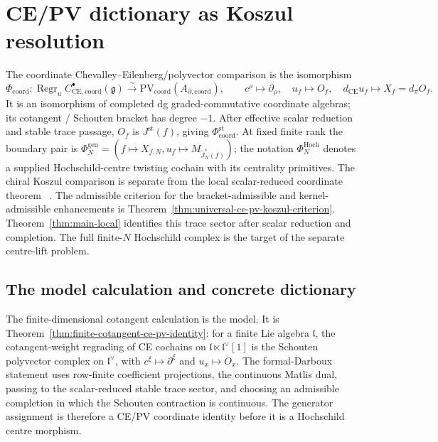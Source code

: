 \documentclass[11pt]{memoir}
\begin{document}
\section{CE/PV dictionary as Koszul resolution}\label{sec:ce-pv-koszul}

The coordinate Chevalley--Eilenberg/polyvector comparison is the
isomorphism
\[
  \Phi_{\mathrm{coord}}\colon
  \operatorname{Regr}_u
  C^\bullet_{\mathrm{CE},\mathrm{coord}}(\mathfrak g)
  \xrightarrow{\sim}
  \mathrm{PV}_{\mathrm{coord}}(A_{\partial,\mathrm{coord}}),
  \qquad
  c^\rho\mapsto\partial_\rho,\quad
  u_f\mapsto O_f,\quad
  d_{\mathrm{CE}}u_f\mapsto X_f=d_\pi O_f .
\]
It is an isomorphism of completed dg graded-commutative coordinate
algebras; its cotangent / Schouten bracket has degree \(-1\).  After
effective scalar reduction and stable trace passage, \(O_f\) is
\(J^{\mathrm{st}}(f)\), giving
\(\Phi_{\mathrm{coord}}^{\mathrm{st}}\).  At fixed finite rank the
boundary pair is
\(\Phi_N^{\mathrm{gen}}=(f\mapsto X_{f,N},
u_f\mapsto M_{\widetilde J_N^s(f)})\); the notation
\(\Phi_N^{\mathrm{Hoch}}\) denotes a supplied Hochschild-centre
twisting cochain with its centrality primitives.  The chiral Koszul
comparison is separate from the local scalar-reduced coordinate theorem
~\cite{francis-gaitsgory-chiral-koszul}.  The admissible criterion for
the bracket-admissible and kernel-admissible enhancements is
Theorem~\ref{thm:universal-ce-pv-koszul-criterion}.  Theorem~\ref{thm:main-local}
identifies this trace sector after scalar reduction and completion.  The
full finite-\(N\) Hochschild complex is the target of the separate
centre-lift problem.

\subsection{The model calculation and concrete dictionary}
\label{ssec:ce-pv-model-calculation}

The finite-dimensional cotangent calculation is the model.  It is
Theorem~\ref{thm:finite-cotangent-ce-pv-identity}: for a finite
Lie algebra \(\mathfrak l\), the cotangent-weight regrading of CE
cochains on \(\mathfrak l\ltimes\mathfrak l^\vee[1]\) is the Schouten
polyvector complex on \(\mathfrak l^\vee\), with
\(c^\xi\mapsto\partial^\xi\) and \(u_x\mapsto O_x\).  The
formal-Darboux statement uses row-finite coefficient projections, the
continuous Matlis dual,
passing to the scalar-reduced stable trace sector, and choosing an
admissible completion in which the Schouten contraction is continuous.
The generator assignment is therefore a CE/PV coordinate identity
before it is a Hochschild centre morphism.
\end{document}
